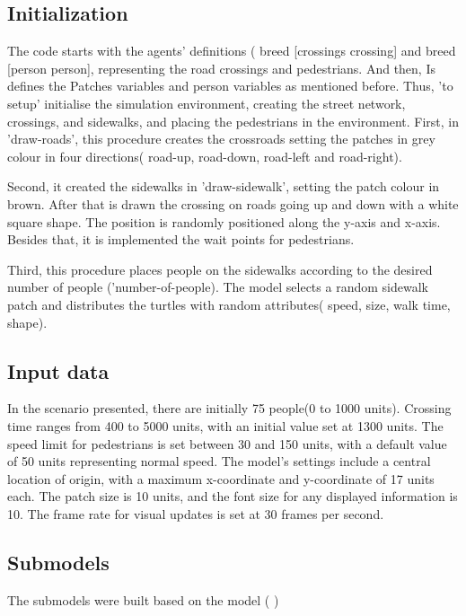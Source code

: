 \documentclass[10pt]{report}
\numberwithin{figure}{section}
\numberwithin{table}{section}
\begin{document}
\subsection{Initialization}

The code starts with the agents' definitions ( breed [crossings crossing] and breed [person person], representing the road crossings and pedestrians. And then, Is defines the Patches variables and person variables as mentioned before. Thus, 'to setup' initialise the simulation environment, creating the street network, crossings, and sidewalks, and placing the pedestrians in the environment. First, in 'draw-roads', this procedure creates the crossroads setting the patches in grey colour in four directions( road-up, road-down, road-left and road-right). 

Second, it created the sidewalks in 'draw-sidewalk', setting the patch colour in brown. After that is drawn the crossing on roads going up and down with a white square shape. The position is randomly positioned along the y-axis and x-axis. Besides that, it is implemented the wait points for pedestrians.

Third, this procedure places people on the sidewalks according to the desired number of people ('number-of-people). The model selects a random sidewalk patch and distributes the turtles with random attributes( speed, size, walk time, shape).



\subsection{Input data}

In the scenario presented, there are initially 75 people(0 to 1000 units). Crossing time ranges from 400 to 5000 units, with an initial value set at 1300 units. The speed limit for pedestrians is set between 30 and 150 units, with a default value of 50 units representing normal speed. The model's settings include a central location of origin, with a maximum x-coordinate and y-coordinate of 17 units each. The patch size is 10 units, and the font size for any displayed information is 10. The frame rate for visual updates is set at 30 frames per second.


\subsection{Submodels}

The submodels were built based on the model ( \cite{lukas_netlogo_nodate}) 
\end{document}
